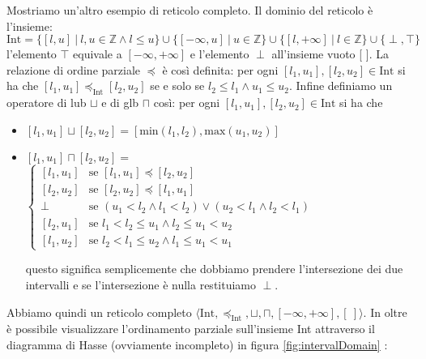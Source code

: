 \begin{example}\label{ex:intervalDomain}
Mostriamo un'altro esempio di reticolo completo. Il dominio del reticolo è l'insieme:
\[\textrm{Int}=\{[l, u]\ |\ l, u\in\mathbb{Z} \wedge l\leq u\} \cup \{[-\infty, u]\ |\ u\in\mathbb{Z}\} \cup \{[l, +\infty]\ |\ l\in\mathbb{Z}\} \cup \{\perp, \top\}\]
l'elemento \(\top\) equivale a \([-\infty, +\infty]\) e l'elemento \(\perp\) all'insieme vuoto [ ].
La relazione di ordine parziale \(\preceq\) è così definita: per ogni \([l_1, u_1], [l_2, u_2]\in\textrm{Int}\) si ha che \([l_1, u_1]\preceq_{\textrm{Int}} [l_2, u_2]\) se e solo se \(l_2\leq l_1 \wedge u_1\leq u_2\). Infine definiamo un operatore di lub \(\sqcup\) e di glb \(\sqcap\) così: per ogni \([l_1, u_1], [l_2, u_2]\in\textrm{Int}\) si ha che 
\begin{itemize}
\item \([l_1, u_1]\sqcup [l_2, u_2] = [\textrm{min}(l_1, l_2), \textrm{max}(u_1, u_2)]\)
\item \([l_1, u_1]\sqcap [l_2, u_2] = \) 
	$
	\begin{cases}
	[l_1, u_1] & \textrm{se } [l_1, u_1]\preceq [l_2, u_2] \\
	[l_2, u_2] & \textrm{se } [l_2, u_2]\preceq [l_1, u_1] \\
	\perp      & \textrm{se } (u_1 < l_2 \wedge l_1 < l_2) \vee (u_2 < l_1 \wedge l_2 < l_1) \\
	[l_2, u_1] & \textrm{se } l_1<l_2\leq u_1 \wedge l_2\leq u_1<u_2 \\
	[l_1, u_2] & \textrm{se } l_2<l_1\leq u_2 \wedge l_1\leq u_1<u_1
	\end{cases} 
	$
 
    questo significa semplicemente che dobbiamo prendere l'intersezione dei due intervalli e se l'intersezione è nulla restituiamo \(\perp\).
\end{itemize}
Abbiamo quindi un reticolo completo \(\langle\textrm{Int}, \preceq_{\textrm{Int}}, \sqcup, \sqcap, [-\infty, +\infty], [\ ] \rangle\). In oltre è possibile visualizzare l'ordinamento parziale sull'insieme Int attraverso il diagramma di Hasse (ovviamente incompleto) in figura \ref{fig:intervalDomain} :

\begin{figure}
\begin{center}
\begin{scriptsize}
\end{scriptsize}
\end{center}
\end{figure}
\end{example}
